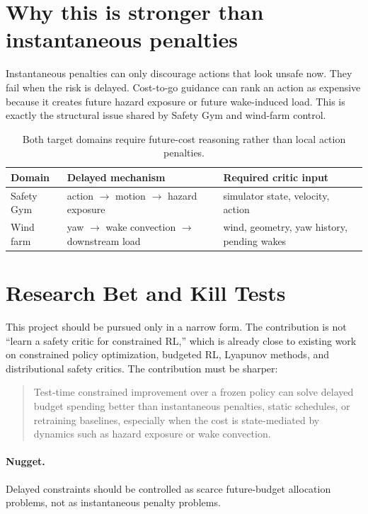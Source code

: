 \documentclass[11pt]{article}
\begin{document}
\section{Why this is stronger than instantaneous penalties}

Instantaneous penalties can only discourage actions that look unsafe now.
They fail when the risk is delayed.
Cost-to-go guidance can rank an action as expensive because it creates future hazard exposure or future wake-induced load.
This is exactly the structural issue shared by Safety Gym and wind-farm control.

\begin{table}[h]
\centering
\begin{tabular}{lll}
\toprule
Domain & Delayed mechanism & Required critic input \\
\midrule
Safety Gym & action $\rightarrow$ motion $\rightarrow$ hazard exposure & simulator state, velocity, action \\
Wind farm & yaw $\rightarrow$ wake convection $\rightarrow$ downstream load & wind, geometry, yaw history, pending wakes \\
\bottomrule
\end{tabular}
\caption{Both target domains require future-cost reasoning rather than local action penalties.}
\end{table}

\section{Research Bet and Kill Tests}

This project should be pursued only in a narrow form.
The contribution is not ``learn a safety critic for constrained RL,'' which is already close to existing work on constrained policy optimization, budgeted RL, Lyapunov methods, and distributional safety critics.
The contribution must be sharper:
\begin{quote}
Test-time constrained improvement over a frozen policy can solve delayed budget spending better than instantaneous penalties, static schedules, or retraining baselines, especially when the cost is state-mediated by dynamics such as hazard exposure or wake convection.
\end{quote}

\paragraph{Nugget.}
Delayed constraints should be controlled as scarce future-budget allocation problems, not as instantaneous penalty problems.
\end{document}
